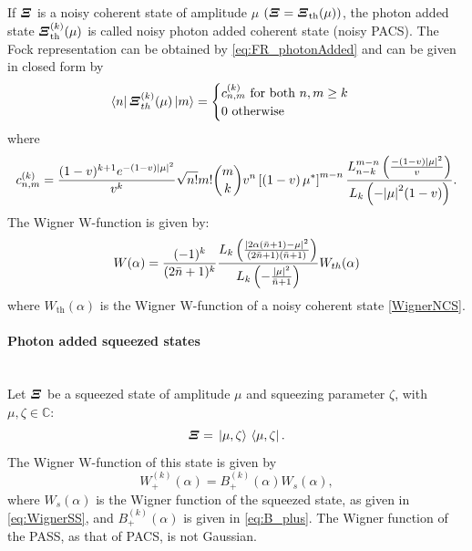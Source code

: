         If $\Operator{\varXi}$ is a noisy coherent state of amplitude $\mu$ 
        $(\Operator{\varXi}=\Operator{\varXi}_{\mathrm{th}}(\mu))$,
        the photon added state $\Operator{\varXi}_{\mathrm{th}}^{(k)}(\mu)$ is called noisy photon added coherent state
        (noisy PACS).
        The Fock representation can be obtained by \ref{eq:FR_photonAdded} and can be given in closed
        form by \cite{PACSDisc}
        \begin{equation}
            \bra{n}\Operator{\varXi}_{th}^{(k)}(\mu)\ket{m}=
            \begin{cases}
                c_{n,m}^{(k)} \mbox{\ for\ both\ } n,m \geq k\\
                0\mbox{\ otherwise}
            \end{cases}
        \end{equation}
        where
        \begin{equation*}
            c_{n,m}^{(k)}=\frac{(1-v)^{k+1}e^{-(1-v)\absolutevalue{\mu}^2}}{v^k}
            \sqrt{n!}{m!}\binom{m}{k} v^n \left[\left(1-v\right)\mu^*\right]^{m-n}
            \frac{L^{m-n}_{n-k} \left( \frac{-(1-v)\absolutevalue{\mu}^2}{v} \right)}
            {L_k \left( -\absolutevalue{\mu}^2 (1-v) \right)}.
        \end{equation*}
        The Wigner W-function is given by:
        \begin{equation}
            W(\alpha)=\frac{(-1)^k}{(2\bar{n}+1)^k}\frac{L_k \left( 
                \frac{\absolutevalue{2\alpha(\bar{n}+1)-\mu}^2}{(2\bar{n}+1)(\bar{n}+1)} \right)}
                {L_k \left(-\frac{\absolutevalue{\mu}^2}{\bar{n}+1} \right)} W_{th}(\alpha)
        \end{equation}
        where $W_{\mathrm{th}}(\alpha)$ is the Wigner W-function of a noisy coherent state \ref{WignerNCS}.
        
        \paragraph{Photon added squeezed states}\mbox{}\\
        Let $\Operator{\varXi}$ be a squeezed state of amplitude $\mu$ and squeezing parameter $\zeta$,
        with $\mu,\zeta \in \mathbb{C}$:
        \begin{equation*}
            \Operator{\varXi}=\ket*{\mu,\zeta}\bra*{\mu,\zeta}.
        \end{equation*}
        The Wigner W-function of this state is given by
        \begin{equation}
            W_+^{(k)}(\alpha) = B_+^{(k)}(\alpha) W_s(\alpha),
        \end{equation}
        where $W_s(\alpha)$ is the Wigner function of the squeezed state, as given in 
        \ref{eq:WignerSS}, and $B_+^{(k)}(\alpha)$ is 
        given in \ref{eq:B_plus}.
        The Wigner function of the PASS, as that of PACS, is not Gaussian.


